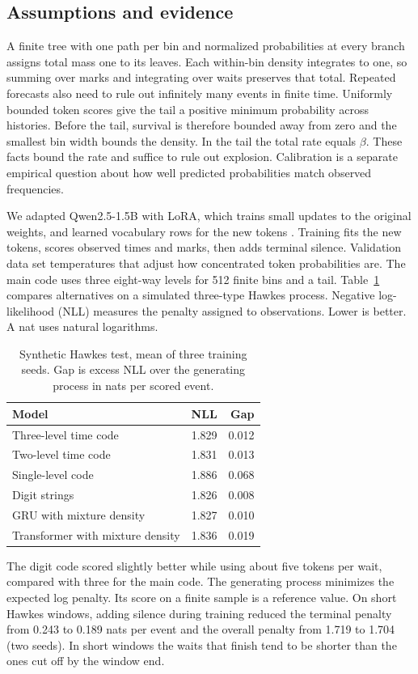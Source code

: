 \documentclass[sigconf,nonacm]{acmart}
\begin{document}
\subsection{Assumptions and evidence}
A finite tree with one path per bin and normalized probabilities at every branch assigns total mass one to its leaves. Each within-bin density integrates to one, so summing over marks and integrating over waits preserves that total. Repeated forecasts also need to rule out infinitely many events in finite time. Uniformly bounded token scores give the tail a positive minimum probability across histories. Before the tail, survival is therefore bounded away from zero and the smallest bin width bounds the density. In the tail the total rate equals $\beta$. These facts bound the rate and suffice to rule out explosion. Calibration is a separate empirical question about how well predicted probabilities match observed frequencies.

We adapted Qwen2.5-1.5B with LoRA, which trains small updates to the original weights, and learned vocabulary rows for the new tokens \cite{qwen2025qwen25,hu2022lora}. Training fits the new tokens, scores observed times and marks, then adds terminal silence. Validation data set temperatures that adjust how concentrated token probabilities are. The main code uses three eight-way levels for 512 finite bins and a tail. Table~\ref{tab:hawkes} compares alternatives on a simulated three-type Hawkes process. Negative log-likelihood (NLL) measures the penalty assigned to observations. Lower is better. A nat uses natural logarithms.
\begin{table}[ht]
\caption{Synthetic Hawkes test, mean of three training seeds. Gap is excess NLL over the generating process in nats per scored event.}\label{tab:hawkes}
\centering\begin{tabular}{lrr}\toprule Model & NLL & Gap\\\midrule
Three-level time code & 1.829 & 0.012\\
Two-level time code & 1.831 & 0.013\\
Single-level code & 1.886 & 0.068\\
Digit strings & 1.826 & 0.008\\
GRU with mixture density & 1.827 & 0.010\\
Transformer with mixture density & 1.836 & 0.019\\\bottomrule\end{tabular}
\end{table}

The digit code scored slightly better while using about five tokens per wait, compared with three for the main code. The generating process minimizes the expected log penalty. Its score on a finite sample is a reference value. On short Hawkes windows, adding silence during training reduced the terminal penalty from 0.243 to 0.189 nats per event and the overall penalty from 1.719 to 1.704 (two seeds). In short windows the waits that finish tend to be shorter than the ones cut off by the window end.
\end{document}
